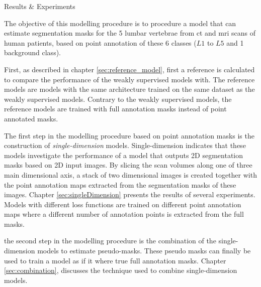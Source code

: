 \begin{partwithabstract}{Results \& Experiments}
    \par{
    The objective of this modelling procedure is to procedure a model that can estimate segmentation masks for the 5 lumbar vertebrae from \acrfull{ct} and \acrfull{mri} scans of human patients, 
    based on point annotation of these 6 classes ($L1$ to $L5$ and 1 background class).
}
\par{
    First, as described in chapter \ref{sec:reference_model}, first a reference is calculated to compare the performance of the weakly supervised models with.
    The reference models are models with the same architecture trained on the same dataset as the weakly supervised models. 
    Contrary to the weakly supervised models, the reference models are trained with full annotation masks instead of point annotated masks. 
}
\par{
    The first step in the modelling procedure based on point annotation masks is the construction of \textit{single-dimension} models.
    Single-dimension indicates that these models investigate the performance of a model that outputs 2D segmentation masks based on 2D input images.
    By slicing the scan volumes along one of three main dimensional axis, a stack of two dimensional images is created together with the point annotation maps extracted from the segmentation masks of these images.
    Chapter \ref{sec:singleDimension} presents the results of several experiments. 
    Models with different loss functions are trained on different point annotation maps where a different number of annotation points is extracted from the full masks.
}
\par{
    the second step in the modelling procedure is the combination of the single-dimension models to estimate pseudo-masks.
    These pseudo masks can finally be used to train a model as if it where true full annotation masks.
    Chapter \ref{sec:combination}, discusses the technique used to combine single-dimension models.
}
\end{partwithabstract}
\restoregeometry







